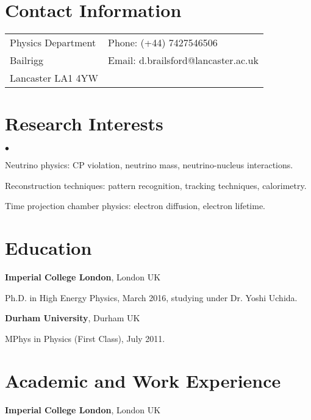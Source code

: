 \documentclass[margin,line]{res}
\newenvironment{list1}{
  \begin{list}{\ding{113}}{%
      \setlength{\itemsep}{0in}
      \setlength{\parsep}{0in} \setlength{\parskip}{0in}
      \setlength{\topsep}{0in} \setlength{\partopsep}{0in} 
      \setlength{\leftmargin}{0.17in}}}{\end{list}}
\newenvironment{list2}{
  \begin{list}{$\bullet$}{%
      \setlength{\itemsep}{0in}
      \setlength{\parsep}{0in} \setlength{\parskip}{0in}
      \setlength{\topsep}{0in} \setlength{\partopsep}{0in} 
      \setlength{\leftmargin}{0.2in}}}{\end{list}}
\begin{document}

\begin{resume}
\section{\sc Contact Information}
\vspace{.05in}
\begin{tabular}{@{}p{2in}p{4in}}
Physics Department           & { Phone:}  (+44) 7427546506\\
Bailrigg   & { Email:}    d.brailsford@lancaster.ac.uk \\      
Lancaster  LA1 4YW & \\   
\end{tabular}


\section{\sc Research Interests}
\begin{list2}
\item Neutrino physics: CP violation, neutrino mass, neutrino-nucleus interactions.
\item Reconstruction techniques: pattern recognition, tracking techniques, calorimetry.
\item Time projection chamber physics: electron diffusion, electron lifetime. 
\end{list2}

\section{\sc Education}
{\bf Imperial College London}, London UK\\
\vspace*{-.1in}
\begin{list1}
\item[] Ph.D. in High Energy Physics, March 2016, studying under Dr. Yoshi Uchida.
\end{list1}

{\bf Durham University}, Durham UK\\
\vspace*{-.1in}
\begin{list1}
\item[] MPhys in Physics (First Class), July 2011.
\end{list1}


\section{\sc Academic and Work Experience}
{\bf Imperial College London}, London UK


\end{resume}
\end{document}
